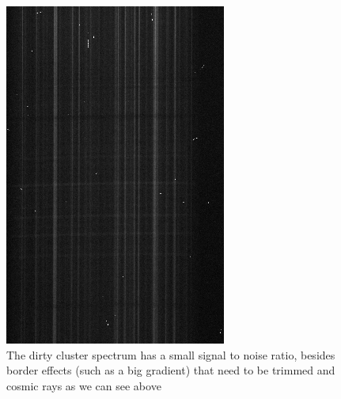 \begin{figure}[H]
  \centering
  \begin{minipage}[b]{0.45\textwidth}
    \includegraphics[width=\textwidth]{images/cluster_dirty.png}
    \caption{The dirty cluster spectrum has a small signal to noise ratio, besides border effects (such as a big gradient) that need to be trimmed and cosmic rays as we can see above}
  \end{minipage}
  \hfill
  \begin{minipage}[b]{0.45\textwidth}

\end{minipage}
\end{figure}
